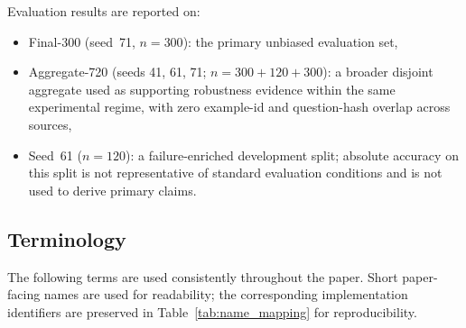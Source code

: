 Evaluation results are reported on:
\begin{itemize}[nosep,leftmargin=1.5em]
    \item Final-300 (seed~71, $n=300$): the primary unbiased evaluation set,
    \item Aggregate-720 (seeds 41, 61, 71; $n=300+120+300$): a broader
          disjoint aggregate used as supporting robustness evidence within the
          same experimental regime, with zero example-id and question-hash
          overlap across sources,
    \item Seed~61 ($n=120$): a failure-enriched development split; absolute
          accuracy on this split is not representative of standard evaluation
          conditions and is not used to derive primary claims.
\end{itemize}

\subsection{Terminology}
\label{sec:terminology}

The following terms are used consistently throughout the paper.
Short paper-facing names are used for readability; the corresponding
implementation identifiers are preserved in Table~\ref{tab:name_mapping} for
reproducibility.

